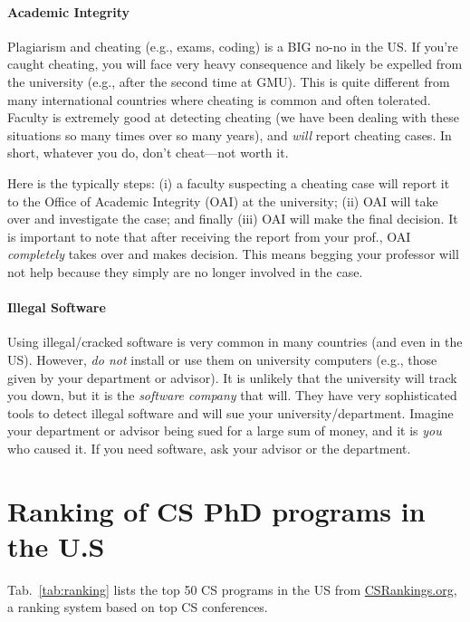 \documentclass[11pt]{article}
\begin{document}
\paragraph{Academic Integrity} Plagiarism and cheating (e.g., exams, coding) is a BIG no-no in the US.  If you're caught cheating, you will face very heavy consequence and likely be expelled from the university (e.g., after the second time at GMU).   This is quite different from many international countries where cheating is common and often tolerated.  Faculty is extremely good at detecting cheating (we have been dealing with these situations so many times over so many years), and \emph{will} report cheating cases.  In short, whatever you do, don't cheat---not worth it.

Here is the typically steps: (i) a faculty suspecting a cheating case will report it to the Office of Academic Integrity (OAI) at the university;  (ii)  OAI will take over and investigate the case; and finally (iii) OAI will make the final decision.  It is important to note that after receiving the report from your prof., OAI \emph{completely} takes over and makes decision.  This means begging your professor will not help because they simply are no longer involved in the case.
    
\paragraph{Illegal Software} Using illegal/cracked software is very common in many countries (and even in the US). However, \emph{do not} install or use them on university computers (e.g., those given by your department or advisor).  It is unlikely that the university will track you down, but it is the \emph{software company} that will.  They have very sophisticated tools to detect illegal software and will sue your university/department.  Imagine your department or advisor being sued for a large sum of money, and it is \emph{you} who caused it.  If you need software, ask your advisor or the department.


\section{Ranking of CS PhD programs in the U.S}\label{sec:ranking}
  Tab.~\ref{tab:ranking} lists the top 50 CS programs in the US from \href{https://www.csrankings.org}{CSRankings.org}, a ranking system  based on top CS conferences.
  
\end{document}
